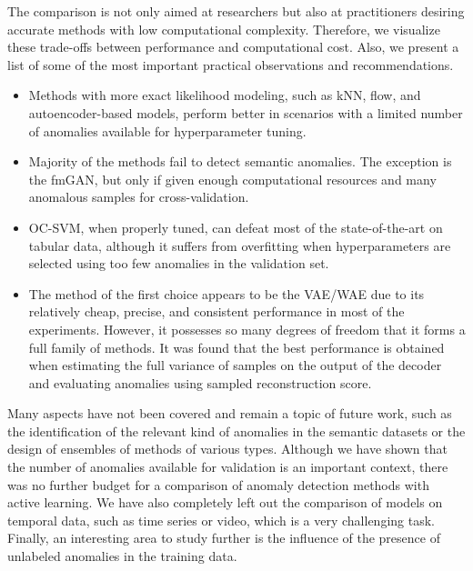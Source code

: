 The comparison is not only aimed at researchers but also at practitioners desiring accurate methods with low computational complexity. Therefore, we visualize these trade-offs between performance and computational cost. Also, we present a list of some of the most important practical observations and recommendations.
\begin{itemize}
    \item Methods with more exact likelihood modeling, such as kNN, flow, and autoencoder-based models, perform better in scenarios with a limited number of anomalies available for hyperparameter tuning.
    \item Majority of the methods fail to detect semantic anomalies. The exception is the fmGAN, but only if given enough computational resources and many anomalous samples for cross-validation. 
    \item OC-SVM, when properly tuned, can defeat most of the state-of-the-art on tabular data, although it suffers from overfitting when hyperparameters are selected using too few anomalies in the validation set.
    \item The method of the first choice appears to be the VAE/WAE due to its relatively cheap, precise, and consistent performance in most of the experiments. However, it possesses so many degrees of freedom that it forms a full family of methods. It was found that the best performance is obtained when estimating the full variance of samples on the output of the decoder and evaluating anomalies using sampled reconstruction score. 
\end{itemize}

Many aspects have not been covered and remain a topic of future work, such as the identification of the relevant kind of anomalies in the semantic datasets or the design of ensembles of methods of various types. Although we have shown that the number of anomalies available for validation is an important context, there was no further budget for a comparison of anomaly detection methods with active learning.  We have also completely left out the comparison of models on temporal data, such as time series or video, which is a very challenging task. Finally, an interesting area to study further is the influence of the presence of unlabeled anomalies in the training data.
